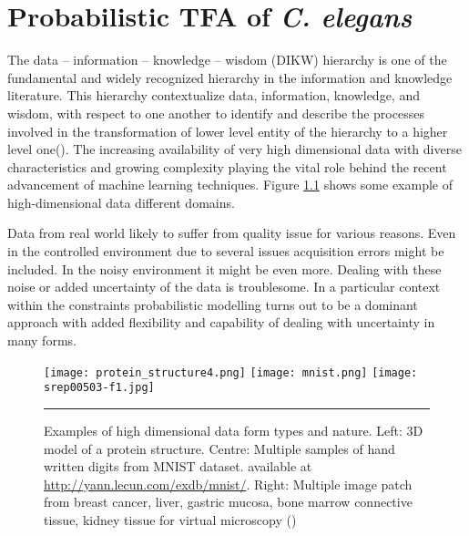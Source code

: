 \chapter{Probabilistic TFA of \textit{C. elegans}}

\ifpdf
    \graphicspath{{Chapter2/Figs/Raster/}{Chapter2/Figs/PDF/}{Chapter2/Figs/}}
\else
    \graphicspath{{Chapter2/Figs/Vector/}{Chapter2/Figs/}}
\fi

The data – information – knowledge – wisdom (DIKW) hierarchy is one of the fundamental and widely recognized hierarchy in the information and knowledge literature. This hierarchy contextualize data, information, knowledge, and wisdom, with respect to one another to identify and describe the processes involved in the transformation of lower level entity of the hierarchy to a higher level one(\cite{Rowley:2007}). The increasing availability of very high dimensional data with diverse characteristics and growing complexity playing the vital role behind the recent advancement of machine learning techniques. Figure \ref{fig:High_dimensional_data} shows some example of high-dimensional data different domains.
 
Data from real world likely to suffer from quality issue for various reasons. Even in the controlled environment due to several issues acquisition errors might be included. In the noisy environment it might be even more. Dealing with these noise or added uncertainty of the data is troublesome. In a particular context within the constraints probabilistic modelling turns out to be a dominant approach with added flexibility and capability of dealing with uncertainty in many forms.

\begin{figure}
	\centering
		\texttt{[image: protein\_structure4.png]}
		\texttt{[image: mnist.png]}
		\texttt{[image: srep00503-f1.jpg]}
		\rule{35em}{0.5pt}
	\caption[Examples of high dimensional data form types and nature]
		{Examples of high dimensional data form types and nature. Left: 3D model of a 
		protein structure. Centre: Multiple
		samples of hand written digits from MNIST dataset. available at 
		\url{http://yann.lecun.com/exdb/mnist/}. Right: Multiple image patch 
		from breast cancer, liver, gastric mucosa, bone marrow connective tissue, kidney tissue for 
		virtual microscopy (\cite{Wienert:2012}) }
	\label{fig:High_dimensional_data}
\end{figure}


